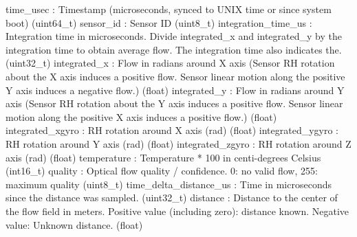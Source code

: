 \begin{DoxyVerb}
\begin{DoxyVerb}
\begin{DoxyVerb}
time_usec                 : Timestamp (microseconds, synced to UNIX time or since system boot) (uint64_t)
sensor_id                 : Sensor ID (uint8_t)
integration_time_us        : Integration time in microseconds. Divide integrated_x and integrated_y by the integration time to obtain average flow. The integration time also indicates the. (uint32_t)
integrated_x              : Flow in radians around X axis (Sensor RH rotation about the X axis induces a positive flow. Sensor linear motion along the positive Y axis induces a negative flow.) (float)
integrated_y              : Flow in radians around Y axis (Sensor RH rotation about the Y axis induces a positive flow. Sensor linear motion along the positive X axis induces a positive flow.) (float)
integrated_xgyro          : RH rotation around X axis (rad) (float)
integrated_ygyro          : RH rotation around Y axis (rad) (float)
integrated_zgyro          : RH rotation around Z axis (rad) (float)
temperature               : Temperature * 100 in centi-degrees Celsius (int16_t)
quality                   : Optical flow quality / confidence. 0: no valid flow, 255: maximum quality (uint8_t)
time_delta_distance_us        : Time in microseconds since the distance was sampled. (uint32_t)
distance                  : Distance to the center of the flow field in meters. Positive value (including zero): distance known. Negative value: Unknown distance. (float)\end{DoxyVerb}
 \mbox{\label{classpymavlink_1_1dialects_1_1v10_1_1MAVLink_ab7341c8e0c961ea68b30fa5fe74d4077}} 

\end{DoxyVerb}
\end{DoxyVerb}
